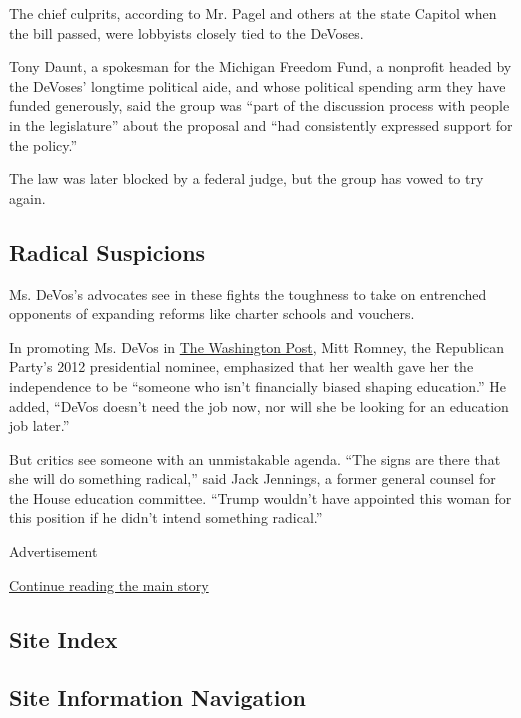 The chief culprits, according to Mr. Pagel and others at the state
Capitol when the bill passed, were lobbyists closely tied to the
DeVoses.

Tony Daunt, a spokesman for the Michigan Freedom Fund, a nonprofit
headed by the DeVoses' longtime political aide, and whose political
spending arm they have funded generously, said the group was ``part of
the discussion process with people in the legislature'' about the
proposal and ``had consistently expressed support for the policy.''

The law was later blocked by a federal judge, but the group has vowed to
try again.

\hypertarget{radical-suspicions}{%
\subsection{Radical Suspicions}\label{radical-suspicions}}

Ms. DeVos's advocates see in these fights the toughness to take on
entrenched opponents of expanding reforms like charter schools and
vouchers.

In promoting Ms. DeVos in
\href{https://www.washingtonpost.com/opinions/mitt-romney-trump-has-made-a-smart-choice-for-education-secretary/2017/01/06/627550e0-d421-11e6-9cb0-54ab630851e8_story.html?utm_term=.84da2c87052a}{The
Washington Post}, Mitt Romney, the Republican Party's 2012 presidential
nominee, emphasized that her wealth gave her the independence to be
``someone who isn't financially biased shaping education.'' He added,
``DeVos doesn't need the job now, nor will she be looking for an
education job later.''

But critics see someone with an unmistakable agenda. ``The signs are
there that she will do something radical,'' said Jack Jennings, a former
general counsel for the House education committee. ``Trump wouldn't have
appointed this woman for this position if he didn't intend something
radical.''

Advertisement

\protect\hyperlink{after-bottom}{Continue reading the main story}

\hypertarget{site-index}{%
\subsection{Site Index}\label{site-index}}

\hypertarget{site-information-navigation}{%
\subsection{Site Information
Navigation}\label{site-information-navigation}}

